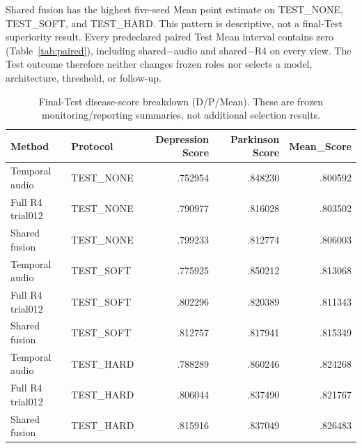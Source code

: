 Shared fusion has the highest five-seed Mean point estimate on TEST\_NONE, TEST\_SOFT, and TEST\_HARD. This pattern is descriptive, not a final-Test superiority result. Every predeclared paired Test Mean interval contains zero (Table~\ref{tab:paired}), including shared$-$audio and shared$-$R4 on every view. The Test outcome therefore neither changes frozen roles nor selects a model, architecture, threshold, or follow-up.

\begin{table}[t]
\centering\small
\caption{Final-Test disease-score breakdown (D/P/Mean). These are frozen monitoring/reporting summaries, not additional selection results.}
\label{tab:protocol-breakdown}
\begin{tabular}{llrrr}
\toprule
Method & Protocol & Depression Score & Parkinson Score & Mean\_Score\\
\midrule
Temporal audio & TEST\_NONE & .752954 & .848230 & .800592\\
Full R4 trial012 & TEST\_NONE & .790977 & .816028 & .803502\\
Shared fusion & TEST\_NONE & .799233 & .812774 & .806003\\
\addlinespace
Temporal audio & TEST\_SOFT & .775925 & .850212 & .813068\\
Full R4 trial012 & TEST\_SOFT & .802296 & .820389 & .811343\\
Shared fusion & TEST\_SOFT & .812757 & .817941 & .815349\\
\addlinespace
Temporal audio & TEST\_HARD & .788289 & .860246 & .824268\\
Full R4 trial012 & TEST\_HARD & .806044 & .837490 & .821767\\
Shared fusion & TEST\_HARD & .815916 & .837049 & .826483\\
\bottomrule
\end{tabular}
\end{table}

\begin{table}[t]
\centering\small
\caption{Frozen paired final-Test Mean deltas (mean [95\% CI]). Every interval includes zero.}
\label{tab:paired}
\end{table}


